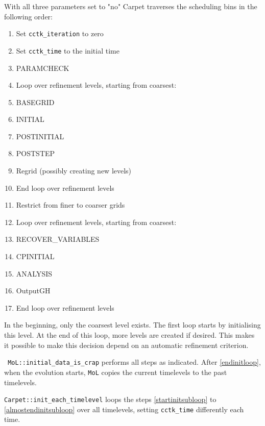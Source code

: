 \documentclass{article}
\begin{document}
With all three parameters set to "no"
Carpet traverses the scheduling bins in the following order:
\begin{enumerate}
\itemsep 0pt
\item
   Set \texttt{cctk\_iteration} to zero
\item
   Set \texttt{cctk\_time} to the initial time
\item
   PARAMCHECK
\item
   Loop over refinement levels, starting from coarsest:
\item \quad
   BASEGRID
\label{startinitsubloop}
\item \quad
   INITIAL
\item \quad
   POSTINITIAL
\item \quad
   POSTSTEP
\label{almostendinitsubloop}
\item \quad
   Regrid (possibly creating new levels)
\label{endinitsubloop}
\item
   End loop over refinement levels
\item
   Restrict from finer to coarser grids
\item
   Loop over refinement levels, starting from coarsest:
\item \quad
   RECOVER\_VARIABLES
\item \quad
   CPINITIAL
\item \quad
   ANALYSIS
\item \quad
   OutputGH
\item
   End loop over refinement levels
\label{endinitloop}
\end{enumerate}

   In the beginning, only the coarsest level exists.  The first loop
   starts by initialising this level.  At the end of this loop, more
   levels are created if desired.  This makes it possible to make this
   decision depend on an automatic refinement criterion.


\texttt{ MoL::initial\_data\_is\_crap} performs all steps as indicated.
 After \ref{endinitloop}, when the evolution starts, \texttt{MoL} copies the
current
timelevels to the past timelevels.

\texttt{Carpet::init\_each\_timelevel} loops the steps \ref{startinitsubloop}
 to
\ref{almostendinitsubloop} over all
timelevels, setting \texttt{cctk\_time} differently each time.
\end{document}
